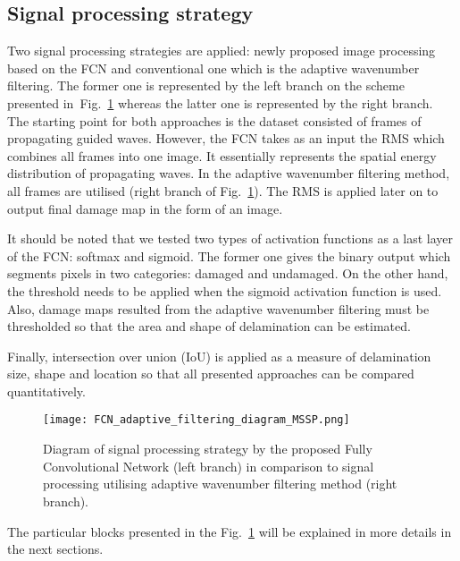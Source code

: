\subsection{Signal processing strategy}
Two signal processing strategies are applied: newly proposed image processing based on the FCN and conventional one which is the adaptive wavenumber filtering.
The former one is represented by the left branch on the scheme presented in~Fig.~\ref{fig:sig_proc_strategy} whereas the latter one is represented by the right branch.
The starting point for both approaches is the dataset consisted of frames of propagating guided waves.
However, the FCN takes as an input the RMS which combines all frames into one image. 
It essentially represents the spatial energy distribution of propagating waves.
In the adaptive wavenumber filtering method, all frames are utilised (right branch of Fig.~\ref{fig:sig_proc_strategy}).
The RMS is applied later on to output final damage map in the form of an image.

It should be noted that we tested two types of activation functions as a last layer of the FCN: softmax and sigmoid.
The former one gives the binary output which segments pixels in two categories: damaged and undamaged.
On the other hand, the threshold needs to be applied when the sigmoid activation function is used.
Also, damage maps resulted from the adaptive wavenumber filtering must be thresholded so that the area and shape of delamination can be estimated.

Finally, intersection over union (IoU) is applied as a measure of delamination size, shape and location so that all presented approaches can be compared quantitatively. 
	\begin{figure}
		\centering
		\texttt{[image: FCN\_adaptive\_filtering\_diagram\_MSSP.png]}
		\caption{Diagram of signal processing strategy by the proposed Fully Convolutional Network (left branch) in comparison to signal processing utilising adaptive wavenumber filtering method (right branch). }
		\label{fig:sig_proc_strategy}
	\end{figure}
The particular blocks presented in the Fig.~\ref{fig:sig_proc_strategy} will be explained in more details in the next sections.